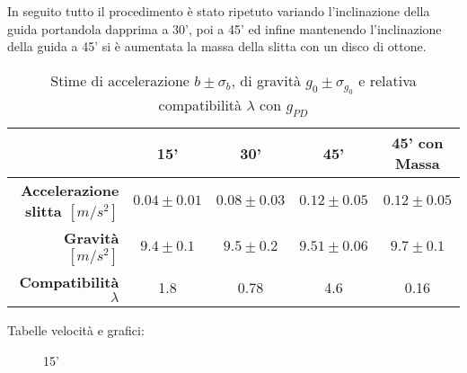 \documentclass[a4paper,11pt,oneside]{article}
\begin{document}
In seguito tutto il procedimento è stato ripetuto variando l'inclinazione della guida portandola dapprima a 30', poi a 45' ed infine mantenendo l'inclinazione della guida a 45' si è aumentata la massa della slitta con un disco di ottone.\\

\begin{table}[h!]%
    \centering
    \begin{tabular}{r|c|c|c|c}
    \toprule
    & \textbf{15'} & \textbf{30'} & \textbf{45'} & \textbf{45' con Massa}\\
    \midrule
         \textbf{Accelerazione slitta $[\si{m/s^2}]$} & $0.04\pm0.01$    & $0.08\pm0.03$   & $0.12\pm0.05$    & $0.12\pm0.05$\\
        \textbf{Gravità $[\si{m/s^2}]$}       & $9.4\pm0.1$ & $9.5\pm0.2$ & $9.51\pm0.06$ & $9.7\pm0.1$ \\
        \textbf{Compatibilità $\lambda$} &1.8 &0.78 &4.6 &0.16\\
        \bottomrule
    \end{tabular}
    \caption{Stime di accelerazione $b\pm \sigma_{b}$, di gravità $g_{0} \pm \sigma_{g_{0}}$ e relativa compatibilità $\lambda$ con $g_{PD}$}
    \label{tab:stima_b_g}
\end{table}


Tabelle velocità e grafici:

\begin{figure}[h!]
    \centering
    \caption{15'}
\end{figure}
\end{document}
